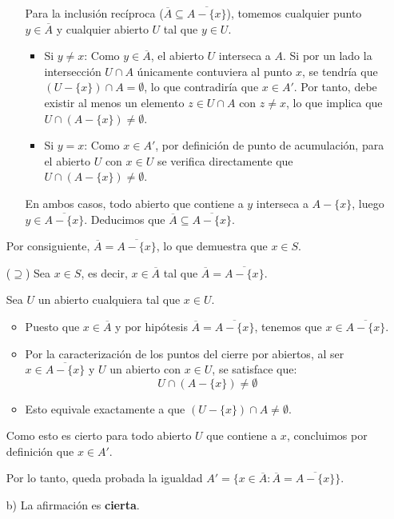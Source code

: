\begin{sol}
\begin{enumerate}
\begin{itemize}
        Para la inclusión recíproca ($\overline{A} \subseteq \overline{A - \{x\}}$), tomemos cualquier punto $y \in \overline{A}$ y cualquier abierto $U$ tal que $y \in U$.
        \begin{itemize}
            \item Si $y \neq x$: Como $y \in \overline{A}$, el abierto $U$ interseca a $A$. Si por un lado la intersección $U \cap A$ únicamente contuviera al punto $x$, se tendría que $(U - \{x\}) \cap A = \emptyset$, lo que contradiría que $x \in A'$. Por tanto, debe existir al menos un elemento $z \in U \cap A$ con $z \neq x$, lo que implica que $U \cap (A - \{x\}) \neq \emptyset$.
            \item Si $y = x$: Como $x \in A'$, por definición de punto de acumulación, para el abierto $U$ con $x \in U$ se verifica directamente que $U \cap (A - \{x\}) \neq \emptyset$.
        \end{itemize}
        En ambos casos, todo abierto que contiene a $y$ interseca a $A - \{x\}$, luego $y \in \overline{A - \{x\}}$. Deducimos que $\overline{A} \subseteq \overline{A - \{x\}}$.
    \end{itemize}
    Por consiguiente, $\overline{A} = \overline{A - \{x\}}$, lo que demuestra que $x \in S$.

    \medskip

   ($\supseteq$) Sea $x \in S$, es decir, $x \in \overline{A}$ tal que $\overline{A} = \overline{A - \{x\}}$.

    Sea $U$ un abierto cualquiera tal que $x \in U$.
    \begin{itemize}
        \item Puesto que $x \in \overline{A}$ y por hipótesis $\overline{A} = \overline{A - \{x\}}$, tenemos que $x \in \overline{A - \{x\}}$.
        \item Por la caracterización de los puntos del cierre por abiertos, al ser $x \in \overline{A - \{x\}}$ y $U$ un abierto con $x \in U$, se satisface que:
        \[
            U \cap (A - \{x\}) \neq \emptyset
        \]
        \item Esto equivale exactamente a que $(U - \{x\}) \cap A \neq \emptyset$.
    \end{itemize}
    Como esto es cierto para todo abierto $U$ que contiene a $x$, concluimos por definición que $x \in A'$.

    \medskip

    Por lo tanto, queda probada la igualdad $A' = \{x \in \overline{A} : \overline{A} = \overline{A - \{x\}}\}$.
    \item[b)]
    La afirmación es \textbf{cierta}. 


\end{enumerate}
\end{sol}
